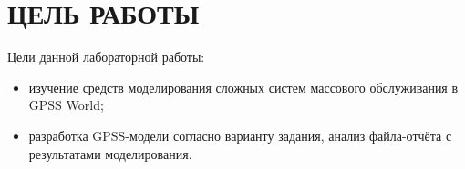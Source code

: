 \section{ЦЕЛЬ РАБОТЫ}

Цели данной лабораторной работы:

\begin{itemize}

\item
  изучение средств моделирования сложных систем массового 
  обслуживания в GPSS World;
\item
  разработка GPSS-модели согласно варианту задания, 
  анализ файла-отчёта с результатами моделирования.

\end{itemize}
